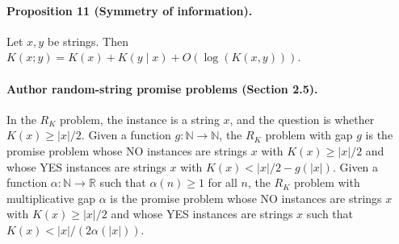 \documentclass[10pt,a4paper]{article}
\begin{document}
\paragraph{Proposition 11 (Symmetry of information).}
Let $x,y$ be strings. Then $K(x;y)=K(x)+K(y\mid x)+O(\log(K(x,y)))$.
\paragraph{Author random-string promise problems (Section 2.5).}
In the $R_K$ problem, the instance is a string $x$, and the question is whether $K(x)\geq|x|/2$. Given a function $g:\mathbb N\to\mathbb N$, the $R_K$ problem with gap $g$ is the promise problem whose NO instances are strings $x$ with $K(x)\geq|x|/2$ and whose YES instances are strings $x$ with $K(x)<|x|/2-g(|x|)$. Given a function $\alpha:\mathbb N\to\mathbb R$ such that $\alpha(n)\geq1$ for all $n$, the $R_K$ problem with multiplicative gap $\alpha$ is the promise problem whose NO instances are strings $x$ with $K(x)\geq|x|/2$ and whose YES instances are strings $x$ such that $K(x)<|x|/(2\alpha(|x|))$.
\end{document}
